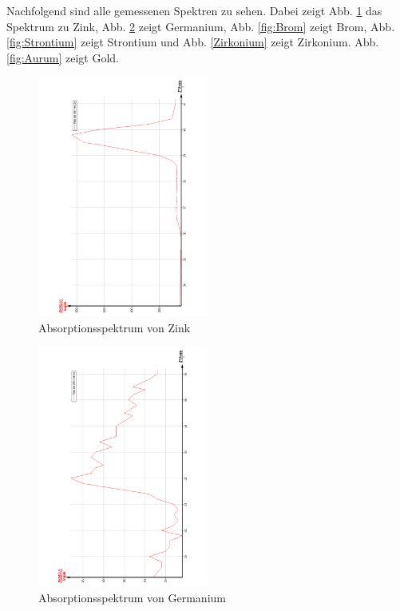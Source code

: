 Nachfolgend sind alle gemessenen Spektren zu sehen. Dabei zeigt Abb. \ref{fig:Zink}
das Spektrum zu Zink, Abb. \ref{fig:Germanium} zeigt Germanium, Abb. \ref{fig:Brom}
zeigt Brom, Abb. \ref{fig:Strontium} zeigt Strontium und Abb. \ref{Zirkonium} zeigt
Zirkonium. Abb. \ref{fig:Aurum} zeigt Gold.
\begin{figure}
  \centering
  \includegraphics[width=0.5\textwidth, angle=270]{bilder/AbsorpZn.pdf}
  \caption{Absorptionsspektrum von Zink}
  \label{fig:Zink}
\end{figure}

\begin{figure}
  \centering
  \includegraphics[width=0.5\textwidth, angle=270]{bilder/AbsorpGe.pdf}
  \caption{Absorptionsspektrum von Germanium}
  \label{fig:Germanium}
\end{figure}

